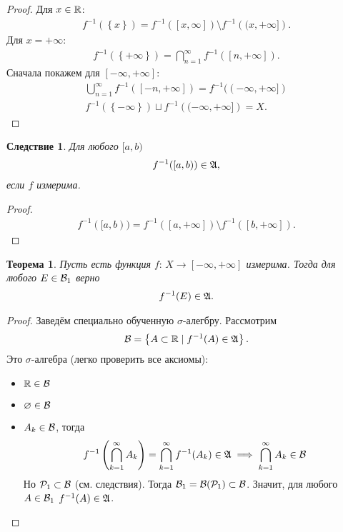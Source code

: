 \documentclass[a4paper,14pt]{extarticle}
\newcounter{theoremCnt}
\theoremstyle{definition}
\theoremstyle{plain}
\newtheorem{thm}[theoremCnt]{Теорема}
\theoremstyle{plain}
\theoremstyle{plain}
\newtheorem{crly}[theoremCnt]{Следствие}
\theoremstyle{plain}
\theoremstyle{definition}
\theoremstyle{definition}
\theoremstyle{definition}
\theoremstyle{definition}
\theoremstyle{definition}
\theoremstyle{definition}
\theoremstyle{plain}
\theoremstyle{plain}
\theoremstyle{plain}
\theoremstyle{plain}
\theoremstyle{definition}
\theoremstyle{definition}
\theoremstyle{definition}
\theoremstyle{definition}
\theoremstyle{definition}
\newcommand{\R}{\ensuremath \mathbb{R}}
\newcommand{\A}{\ensuremath \mathfrak{A}}
\newcommand{\p}{\ensuremath \mathcal{P}}
\begin{document}
\begin{proof} Для $x \in \R$:
 \begin{align*}
  f^{-1}( \left\{ x \right\} ) = f^{-1}( [x, \infty] ) \setminus f^{-1} \left( (x, +\infty] \right)
 .\end{align*}  Для $x = +\infty$:
 \begin{align*}
  f^{-1} \left( \left\{ +\infty \right\} \right) = \bigcap_{n=1}^{\infty} f^{-1} \left( [n, +\infty] \right)
 .\end{align*} Сначала покажем для $[-\infty, +\infty]$:
 \begin{align*}
  \bigcup_{n=1}^{\infty} f^{-1}([-n, +\infty]) = f^{-1}( (-\infty, +\infty] ) \\
  f^{-1}(\left\{ -\infty \right\}) \sqcup f^{-1} \left( (-\infty, +\infty] \right) = X
 .\end{align*}
\end{proof}
\begin{crly}
 Для любого $[a, b)$
 \begin{align*}
  f^{-1}([a, b)) \in \A
 ,\end{align*} если $f$ измерима.
\end{crly}
\begin{proof}
 \begin{align*}
  f^{-1}( [a, b) ) = f^{-1} \left( [a, +\infty] \right) \setminus f^{-1} \left( [b, +\infty] \right)
 .\end{align*}
\end{proof}
\begin{thm}
 Пусть есть функция $f \colon\, X \to [-\infty, +\infty] $ измерима. Тогда для любого $E \in \mathcal{B}_1$ верно
 \begin{align*}
  f^{-1}(E) \in \A
 .\end{align*}
\end{thm}
\begin{proof}
 Заведём специально обученную $\sigma$-алегбру. Рассмотрим
 \begin{align*}
  \B = \left\{ A \subset \R \mid f^{-1}(A) \in \A \right\}
 .\end{align*} Это $\sigma$-алгебра (легко проверить все аксиомы):
 \begin{itemize}
  \item $\R \in \B$
  \item $\varnothing \in \mathcal{B}$
  \item $A_k \in \mathcal{B}$, тогда
   \begin{align*}
    f^{-1}\left(\bigcap_{k=1}^{\infty} A_k \right) = \bigcap_{k=1}^{\infty} f^{-1}(A_k) \in \A \implies \bigcap_{k=1}^{\infty} A_k \in \B
   \end{align*}
   Но $\p_1 \subset \B$ (см. следствия). Тогда $\B_1 = \B(\p_1) \subset \B$. Значит, для любого  $A \in \mathcal{B}_1$ $f^{-1}(A) \in \A$.
 \end{itemize}
\end{proof}
\end{document}
